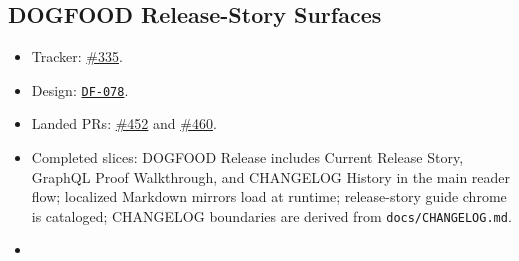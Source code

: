 \subsection{DOGFOOD Release-Story Surfaces}\label{record-261-dogfood-release-story-surfaces}

\begin{itemize}
\tightlist
\item
  Tracker: \href{https://github.com/flyingrobots/bijou/issues/335}{\#335}.
\item
  Design: \href{https://github.com/flyingrobots/bijou/blob/cbd70612140e7a450d764b3c7be1c6af878b99bc/docs/design/DF-078-dogfood-release-story-surfaces.md}{\texttt{D\allowbreak{}F\allowbreak{}-\allowbreak{}0\allowbreak{}7\allowbreak{}8}}.
\item
  Landed PRs: \href{https://github.com/flyingrobots/bijou/pull/452}{\#452} and \href{https://github.com/flyingrobots/bijou/pull/460}{\#460}.
\item
  Completed slices: DOGFOOD Release includes Current Release Story, GraphQL Proof Walkthrough, and CHANGELOG History in the main reader flow; localized Markdown mirrors load at runtime; release-story guide chrome is cataloged; CHANGELOG boundaries are derived from \texttt{d\allowbreak{}o\allowbreak{}c\allowbreak{}s\allowbreak{}/\allowbreak{}C\allowbreak{}H\allowbreak{}A\allowbreak{}N\allowbreak{}G\allowbreak{}E\allowbreak{}L\allowbreak{}O\allowbreak{}G\allowbreak{}.\allowbreak{}m\allowbreak{}d}.
\item

\end{itemize}
